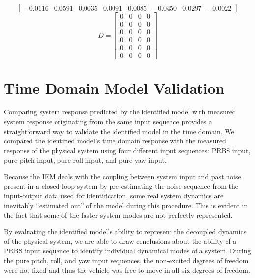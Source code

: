 \begin{table}[!htb]
{\begin{minipage}{5.5in}
\begin{equation*}
\begin{bmatrix}
-0.0116&0.0591&0.0035&0.0091&0.0085&-0.0450&0.0297&-0.0022
\end{bmatrix}
\end{equation*} 
\begin{equation*}
D = \begin{bmatrix}
0&0&0&0\\
0&0&0&0\\
0&0&0&0\\
0&0&0&0\\
0&0&0&0\\
0&0&0&0
\end{bmatrix}
\end{equation*}
\normalsize %
\end{minipage}}
\label{identified_system_matrices}
\end{table}









\newpage
\section{Time Domain Model Validation}
Comparing system response predicted by the identified model with measured system response originating from the same input sequence provides a straightforward way to validate the identified model in the time domain. We compared the identified model's time domain response with the measured response of the physical system using four different input sequences: PRBS input, pure pitch input, pure roll input, and pure yaw input. 

Because the IEM deals with the coupling between system input and past noise present in a closed-loop system by pre-estimating the noise sequence from the input-output data used for identification, some real system dynamics are inevitably ``estimated out'' of the model during this procedure. This is evident in the fact that some of the faster system modes are not perfectly represented.

By evaluating the identified model's ability to represent the decoupled dynamics of the physical system, we are able to draw conclusions about the ability of a PRBS input sequence to identify individual dynamical modes of a system. During the pure pitch, roll, and yaw input sequences, the non-excited degrees of freedom were not fixed and thus the vehicle was free to move in all six degrees of freedom.

